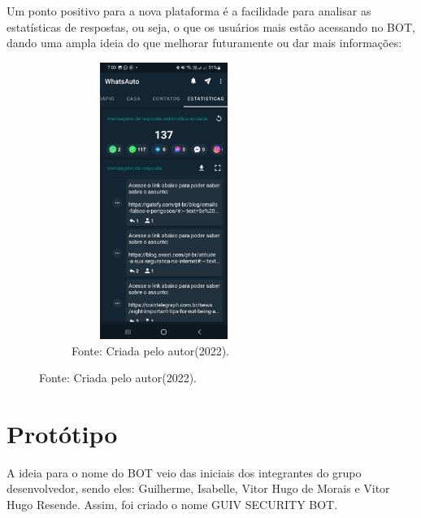 Um ponto positivo para a nova plataforma é a facilidade para analisar as estatísticas de respostas, ou seja, o que os usuários mais estão acessando no BOT, dando uma ampla ideia do que melhorar futuramente ou dar mais informações:

\begin{figure}[!htb]
\centering
\captionsetup[subfigure]{labelformat=empty}
\caption{``Estatisticas de respostas''}
\begin{subfigure}{.5\textwidth}
\centering
\includegraphics[width=6cm,height=9cm]{Partes/Imagens/Estatisticas.jpeg}
\caption{Fonte: Criada pelo autor(2022).}
\end{subfigure}%
\end{figure}

        \newpage


\section{Protótipo}

A ideia para o nome do BOT veio das iniciais dos integrantes do grupo desenvolvedor, sendo eles: Guilherme, Isabelle, Vitor Hugo de Morais e Vitor Hugo Resende. Assim, foi criado o nome GUIV SECURITY BOT.

